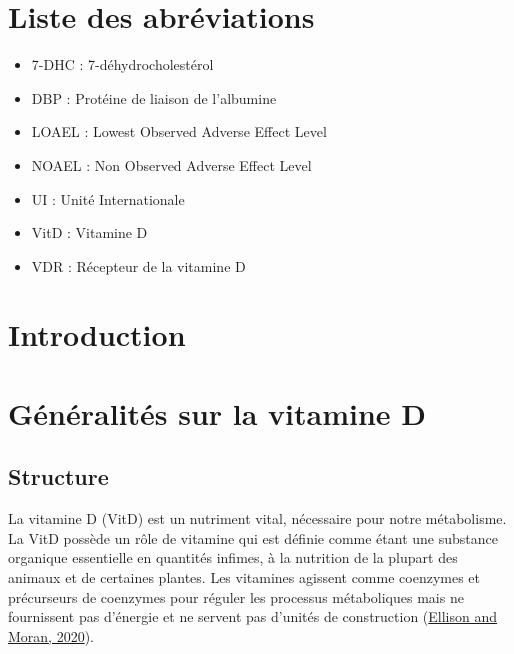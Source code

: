 \documentclass[
  a4paper,
  DIV=11,
  numbers=noendperiod,
  listof=totoc]{scrreprt}
\providecommand{\tightlist}{%
  \setlength{\itemsep}{0pt}\setlength{\parskip}{0pt}}\usepackage{longtable,booktabs,array}
\begin{document}
\hypertarget{liste-des-abruxe9viations}{%
\chapter*{Liste des abréviations}\label{liste-des-abruxe9viations}}

\begin{itemize}
\tightlist
\item
  7-DHC : 7-déhydrocholestérol
\item
  DBP : Protéine de liaison de l'albumine
\item
  LOAEL : Lowest Observed Adverse Effect Level
\item
  NOAEL : Non Observed Adverse Effect Level
\item
  UI : Unité Internationale
\item
  VitD : Vitamine D
\item
  VDR : Récepteur de la vitamine D
\end{itemize}

\newpage{}

\hypertarget{introduction}{%
\chapter{Introduction}\label{introduction}}


\newpage{}

\hypertarget{guxe9nuxe9ralituxe9s-sur-la-vitamine-d}{%
\chapter{Généralités sur la vitamine
D}\label{guxe9nuxe9ralituxe9s-sur-la-vitamine-d}}

\hypertarget{structure}{%
\section{Structure}\label{structure}}

La vitamine D (VitD) est un nutriment vital, nécessaire pour notre
métabolisme. La VitD possède un rôle de vitamine qui est définie comme
étant une substance organique essentielle en quantités infimes, à la
nutrition de la plupart des animaux et de certaines plantes. Les
vitamines agissent comme coenzymes et précurseurs de coenzymes pour
réguler les processus métaboliques mais ne fournissent pas d'énergie et
ne servent pas d'unités de construction
(\protect\hyperlink{ref-Ellison.2020}{Ellison and Moran, 2020}).
\end{document}
